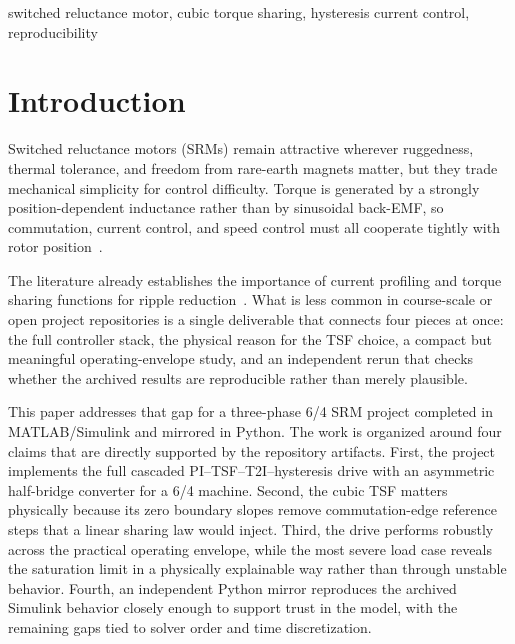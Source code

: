 \documentclass[conference]{IEEEtran}
\begin{document}
\begin{IEEEkeywords}
switched reluctance motor, cubic torque sharing, hysteresis current control, reproducibility
\end{IEEEkeywords}

\section{Introduction}
Switched reluctance motors (SRMs) remain attractive wherever ruggedness, thermal tolerance, and freedom from rare-earth magnets matter, but they trade mechanical simplicity for control difficulty.
Torque is generated by a strongly position-dependent inductance rather than by sinusoidal back-EMF, so commutation, current control, and speed control must all cooperate tightly with rotor position~\cite{Lawrenson1980,Miller1993,Krishnan2001}.

The literature already establishes the importance of current profiling and torque sharing functions for ripple reduction~\cite{Schramm1992,Husain1996,Xue2009,Ye2015}.
What is less common in course-scale or open project repositories is a single deliverable that connects four pieces at once: the full controller stack, the physical reason for the TSF choice, a compact but meaningful operating-envelope study, and an independent rerun that checks whether the archived results are reproducible rather than merely plausible.

This paper addresses that gap for a three-phase 6/4 SRM project completed in MATLAB/Simulink and mirrored in Python.
The work is organized around four claims that are directly supported by the repository artifacts.
First, the project implements the full cascaded PI--TSF--T2I--hysteresis drive with an asymmetric half-bridge converter for a 6/4 machine.
Second, the cubic TSF matters physically because its zero boundary slopes remove commutation-edge reference steps that a linear sharing law would inject.
Third, the drive performs robustly across the practical operating envelope, while the most severe load case reveals the saturation limit in a physically explainable way rather than through unstable behavior.
Fourth, an independent Python mirror reproduces the archived Simulink behavior closely enough to support trust in the model, with the remaining gaps tied to solver order and time discretization.
\end{document}
